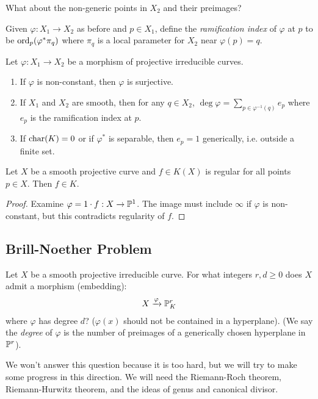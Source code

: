 \documentclass[10pt,a4paper,rgb]{article}
\begin{document}
What about the non-generic points in $X_2$ and their preimages?

Given $\varphi: X_1 \to X_2$ as before and $p \in X_1$, define the \emph{ramification index} of $\varphi$ at $p$ to be $\ord_p (\varphi^{\ast} \pi_q )$ where $\pi_q$ is a local parameter for $X_2$ near $\varphi(p) = q$.

\begin{theorem}
Let $\varphi:X_1 \to X_2$ be a morphism of projective irreducible curves.
\begin{enumerate}
\item If $\varphi$ is non-constant, then $\varphi$ is surjective.
\item If $X_1$ and $X_2$ are smooth, then for any $q \in X_2$, $\deg \varphi = \sum_{p \in \varphi^{-1}(q)} e_p$ where $e_p$ is the ramification index at $p$.
\item If $\charr(K) = 0$ or if $\varphi^{\ast}$ is separable, then $e_p = 1$ generically, i.e. outside a finite set.
\end{enumerate}
\end{theorem}
\begin{proposition}
Let $X$ be a smooth projective curve and $f \in K(X)$ is regular for all points $p \in X$. Then $f \in K$.
\end{proposition}
\begin{proof}
Examine $\varphi= 1\cdot f : X \to \P^1$. The image must include $\infty$ if $\varphi$ is non-constant, but this contradicts regularity of $f$.
\end{proof}

\subsection{Brill-Noether Problem}
Let $X$ be a smooth projective irreducible curve. For what integers $r, d \geq 0$ does $X$ admit a morphism (embedding):
\begin{align*}
X \xrightarrow{\varphi} \P_K^r
\end{align*}
where $\varphi$ has degree $d$? ($\varphi(x)$ should not be contained in a hyperplane). (We say the \emph{degree} of $\varphi$ is the number of preimages of a generically chosen hyperplane in $\P^r$).

We won't answer this question because it is too hard, but we will try to make some progress in this direction. We will need the Riemann-Roch theorem, Riemann-Hurwitz theorem, and the ideas of genus and canonical divisor.
\end{document}
